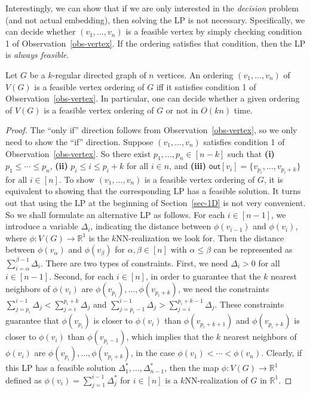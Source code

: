 \documentclass[english]{lipics-v2021}
\begin{document}
Interestingly, we can show that if we are only interested in the \emph{decision} problem (and not actual embedding), then solving the LP is not necessary.
Specifically, we can decide whether $(v_1,\dots,v_n)$ is a feasible vertex by simply checking condition 1 of Observation~\ref{obs-vertex}.
If the ordering satisfies that condition, then the LP is \emph{always feasible}.

\begin{lemma} \label{lem-LP}
Let $G$ be a $k$-regular directed graph of $n$ vertices.
An ordering $(v_1,\dots,v_n)$ of $V(G)$ is a feasible vertex ordering of $G$ iff it satisfies condition 1 of Observation~\ref{obs-vertex}.
In particular, one can decide whether a given ordering of $V(G)$ is a feasible vertex ordering of $G$ or not in $O(kn)$ time.
\end{lemma}
\begin{proof}
The ``only if'' direction follows from Observation~\ref{obs-vertex}, so we only need to show the ``if'' direction.
Suppose $(v_1,\dots,v_n)$ satisfies condition 1 of Observation~\ref{obs-vertex}.
So there exist $p_1,\dots,p_n \in [n-k]$ such that \textnormal{\bf (i)} $p_1 \leq \cdots \leq p_n$, \textnormal{\bf (ii)} $p_i \leq i \leq p_i+k$ for all $i \in n$, and \textnormal{\bf (iii)} $\mathsf{out}[v_i] = \{v_{p_i},\dots,v_{p_i+k}\}$ for all $i \in [n]$.
To show $(v_1,\dots,v_n)$ is a feasible vertex ordering of $G$, it is equivalent to showing that the corresponding LP has a feasible solution.
It turns out that using the LP at the beginning of Section~\ref{sec-1D} is not very convenient.
So we shall formulate an alternative LP as follows.
For each $i \in [n-1]$, we introduce a variable $\Delta_i$, indicating the distance between $\phi(v_{i-1})$ and $\phi(v_i)$, where $\phi:V(G) \rightarrow \mathbb{R}^1$ is the $k$NN-realization we look for.
Then the distance between $\phi(v_\alpha)$ and $\phi(v_\beta)$ for $\alpha,\beta \in [n]$ with $\alpha \leq \beta$ can be represented as $\sum_{i=\alpha}^{\beta-1} \Delta_i$.
There are two types of constraints.
First, we need $\Delta_i > 0$ for all $i \in [n-1]$.
Second, for each $i \in [n]$, in order to guarantee that the $k$ nearest neighbors of $\phi(v_i)$ are $\phi(v_{p_i}),\dots,\phi(v_{p_i+k})$, we need the constraints $\sum_{j=p_i}^{i-1} \Delta_j < \sum_{j=i}^{p_i+k} \Delta_j$ and $\sum_{j=p_i-1}^{i-1} \Delta_j > \sum_{j=i}^{p_i+k-1} \Delta_j$.
These constraints guarantee that $\phi(v_{p_i})$ is closer to $\phi(v_i)$ than $\phi(v_{p_i+k+1})$ and $\phi(v_{p_i+k})$ is closer to $\phi(v_i)$ than $\phi(v_{p_i-1})$, which implies that the $k$ nearest neighbors of $\phi(v_i)$ are $\phi(v_{p_i}),\dots,\phi(v_{p_i+k})$, in the case $\phi(v_1) < \cdots < \phi(v_n)$.
Clearly, if this LP has a feasible solution $\Delta_1^*,\dots,\Delta_{n-1}^*$, then the map $\phi:V(G) \rightarrow \mathbb{R}^1$ defined as $\phi(v_i) = \sum_{j=1}^{i-1} \Delta_j^*$ for $i \in [n]$ is a $k$NN-realization of $G$ in $\mathbb{R}^1$.


\end{proof}
\end{document}
